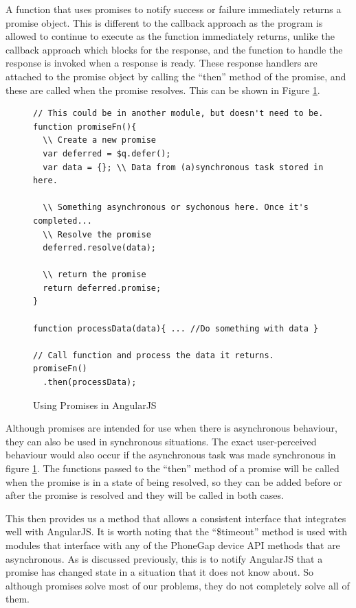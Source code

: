A function that uses promises to notify success or failure immediately
returns a promise object. This is different to the callback approach
as the program is allowed to continue to execute as the function
immediately returns, unlike the callback approach which blocks for the
response, and the function to handle the response is invoked when a
response is ready. These response handlers are attached to the promise
object by calling the ``then'' method of the promise, and these are
called when the promise resolves. This can be shown in Figure
\ref{fig:promises}. 

\begin{figure}[h]
\begin{verbatim}
// This could be in another module, but doesn't need to be.
function promiseFn(){
  \\ Create a new promise
  var deferred = $q.defer();
  var data = {}; \\ Data from (a)synchronous task stored in here.  

  \\ Something asynchronous or sychonous here. Once it's completed...
  \\ Resolve the promise
  deferred.resolve(data);

  \\ return the promise
  return deferred.promise;
}

function processData(data){ ... //Do something with data }

// Call function and process the data it returns.
promiseFn()
  .then(processData);
\end{verbatim}
\caption{Using Promises in AngularJS}
\label{fig:promises}
\end{figure}

Although promises are intended for use when there is asynchronous
behaviour, they can also be used in synchronous situations. The exact
user-perceived behaviour would also occur if the asynchronous task was
made synchronous in figure \ref{fig:promises}. The functions passed to
the ``then'' method of a promise will be called when the promise is in
a state of being resolved, so they can be added before or after the
promise is resolved and they will be called in both cases.

This then provides us a method that allows a consistent interface that
integrates well with AngularJS. It is worth noting that the
``\$timeout'' method is used with modules that interface with any of
the PhoneGap device API methods that are asynchronous. As is discussed
previously, this is to notify AngularJS that a promise has changed
state in a situation that it does not know about. So although promises
solve most of our problems, they do not completely solve all of them.

